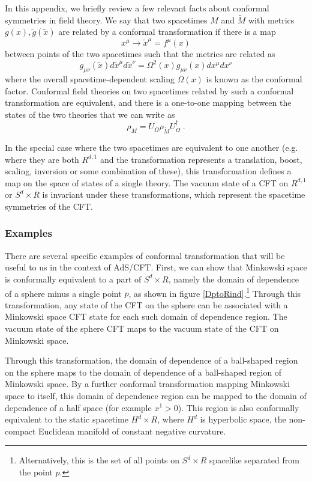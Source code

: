 \documentclass[12pt,epsf]{article}
\newcommand{\be}{\begin{equation}}
\newcommand{\ee}{\end{equation}}
\begin{document}
In this appendix, we briefly review a few relevant facts about conformal symmetries in field theory. We say that two spacetimes $M$ and $\tilde{M}$ with metrics $g(x),\tilde{g}(\tilde{x})$ are related by a conformal transformation if there is a map
\be
\label{ctrans}
x^\mu \to \tilde{x}^\mu = f^\mu(x)
\ee
between points of the two spacetimes such that the metrics are related as
\be
g_{\mu \nu} (\tilde{x}) d \tilde{x}^\mu d \tilde{x}^\nu = \Omega^2(x) g_{\mu \nu} (x) dx^\mu dx^\nu
\ee
where the overall spacetime-dependent scaling $\Omega(x)$ is known as the conformal factor. Conformal field theories on two spacetimes related by such a conformal transformation are equivalent, and there is a one-to-one mapping between the states of the two theories that we can write as
\be
\label{confmap}
\rho_{M} = U_\Omega \rho_{\tilde{M}} U_\Omega^\dagger \; .
\ee

In the special case where the two spacetimes are equivalent to one another (e.g. where they are both $R^{d,1}$ and the transformation represents a translation, boost, scaling, inversion or some combination of these), this transformation defines a map on the space of states of a single theory. The vacuum state of a CFT on $R^{d,1}$ or $S^d \times R$ is invariant under these transformations, which represent the spacetime symmetries of the CFT.

\subsubsection*{Examples}

There are several specific examples of conformal transformation that will be useful to us in the context of AdS/CFT. First, we can show that Minkowski space is conformally equivalent to a part of $S^d \times R$, namely the domain of dependence of a sphere minus a single point $p$, as shown in figure \ref{DptoRind}.\footnote{Alternatively, this is the set of all points on $S^d \times R$ spacelike separated from the point $p$.} Through this transformation, any state of the CFT on the sphere can be associated with a Minkowski space CFT state for each such domain of dependence region. The vacuum state of the sphere  CFT maps to the vacuum state of the CFT on Minkowski space.

Through this transformation, the domain of dependence of a ball-shaped region on the sphere maps to the domain of dependence of a ball-shaped region of Minkowski space. By a further conformal transformation mapping Minkowski space to itself, this domain of dependence region can be mapped to the domain of dependence of a half space (for example $x^1 > 0$). This region is also conformally equivalent to the static spacetime $H^d \times R$, where $H^d$ is hyperbolic space, the non-compact Euclidean manifold of constant negative curvature.
\end{document}
